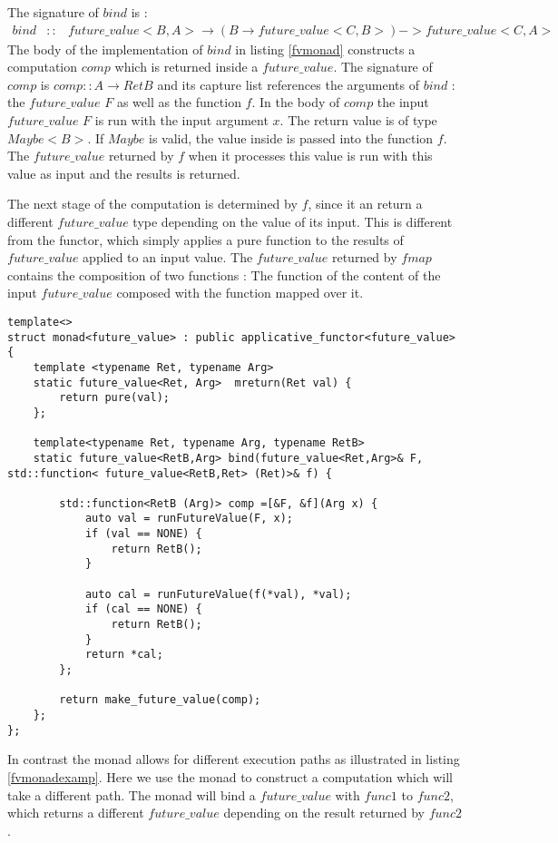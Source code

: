 \documentclass[12pt,fleqn]{article}
\begin{document}
The signature of $bind$ is :
\begin{eqnarray*}
bind &::& future\_value<B,A> \rightarrow (B \rightarrow future\_value<C, B>) -> future\_value<C, A>
\end{eqnarray*}
The body of the implementation of $bind$ in listing \ref{fvmonad} constructs a computation $comp$ which is returned inside a $future\_value$.
The signature of $comp$ is $comp :: A \rightarrow RetB$ and its capture list references the arguments of $bind$ : the $future\_value$ $F$ as well as the function $f$.
In the body of $comp$ the input $future\_value$ $F$ is run with the input argument $x$.
The return value is of type $Maybe<B>$. If $Maybe$ is valid, the value inside is passed into the function $f$.
The $future\_value$ returned by $f$ when it processes this value is run with this value as input and the results is returned.

The next stage of the computation is determined by $f$, since it an return a different $future\_value$ type depending on the value of its input.
This is different from the functor, which simply applies a pure function to the results of $future\_value$ applied to an input value.
The $future\_value$ returned by $fmap$ contains the composition of two functions : The function of the content of the input $future\_value$ composed with the function mapped over it.


\begin{minipage}{\linewidth}
\begin{lstlisting}[caption=Monad for the future value ,label=fvmonad]
template<>
struct monad<future_value> : public applicative_functor<future_value> 
{
	template <typename Ret, typename Arg> 
	static future_value<Ret, Arg>  mreturn(Ret val) {
		return pure(val);
	};

	template<typename Ret, typename Arg, typename RetB>
	static future_value<RetB,Arg> bind(future_value<Ret,Arg>& F, std::function< future_value<RetB,Ret> (Ret)>& f) {

		std::function<RetB (Arg)> comp =[&F, &f](Arg x) {
			auto val = runFutureValue(F, x);
			if (val == NONE) {
				return RetB();
			}
			
			auto cal = runFutureValue(f(*val), *val);
			if (cal == NONE) {
				return RetB();
			}
			return *cal;
		};

		return make_future_value(comp);
	};
};
\end{lstlisting}
\end{minipage}

In contrast the monad allows for different execution paths as illustrated in listing \ref{fvmonadexamp}.
Here we use the monad to construct a computation which will take a different path.
The monad will bind a $future\_value$ with $func1$ to $func2$, which returns a different $future\_value$ depending on the result returned by $func2$.
\end{document}
